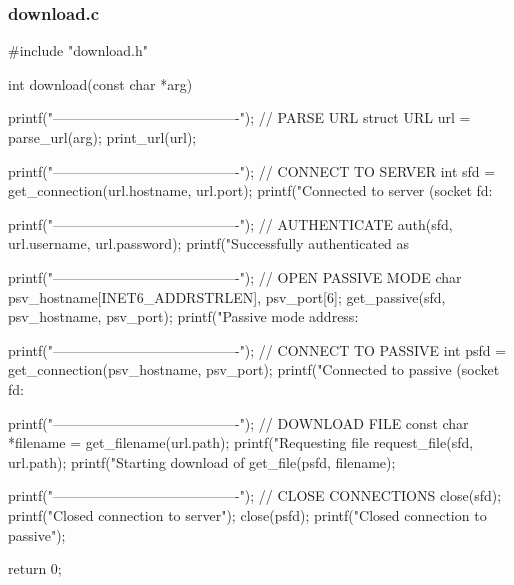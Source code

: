 \documentclass[11pt,a4paper,twocolumn]{article}
\begin{document}
\subsubsection{download.c}
\begin{c-darktheme}
    #include "download.h"

    int download(const char *arg)
    {
        printf("----------------------------------------\n"); // PARSE URL
        struct URL url = parse_url(arg);
        print_url(url);
    
        printf("----------------------------------------\n"); // CONNECT TO SERVER
        int sfd = get_connection(url.hostname, url.port);
        printf("Connected to server (socket fd: %
    
        printf("----------------------------------------\n"); // AUTHENTICATE
        auth(sfd, url.username, url.password);
        printf("Successfully authenticated as %
    
        printf("----------------------------------------\n"); // OPEN PASSIVE MODE
        char psv_hostname[INET6_ADDRSTRLEN], psv_port[6];
        get_passive(sfd, psv_hostname, psv_port);
        printf("Passive mode address: %
    
        printf("----------------------------------------\n"); // CONNECT TO PASSIVE
        int psfd = get_connection(psv_hostname, psv_port);
        printf("Connected to passive (socket fd: %
    
        printf("----------------------------------------\n"); // DOWNLOAD FILE
        const char *filename = get_filename(url.path);
        printf("Requesting file %
        request_file(sfd, url.path);
        printf("Starting download of %
        get_file(psfd, filename);
    
        printf("----------------------------------------\n"); // CLOSE CONNECTIONS
        close(sfd);
        printf("Closed connection to server\n");
        close(psfd);
        printf("Closed connection to passive\n");
    
        return 0;
    }
    
\end{c-darktheme}
\end{document}
